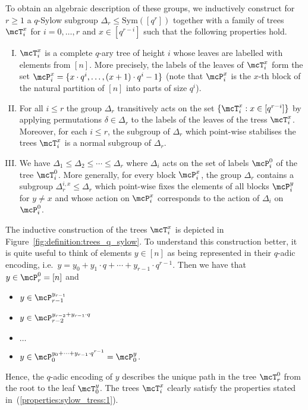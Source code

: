 \documentclass[a4paper,UKenglish]{lipics}
\newcommand{\inseg}[1]{\ensuremath{[#1]}}
\newcommand{\Sym}{\ensuremath{\text{Sym}}\xspace}
\theoremstyle{plain}
\begin{document}
To obtain an algebraic description of these groups, we inductively 
construct for $r \geq 1$ a $q$-Sylow subgroup $\Delta_r \leq \Sym(\inseg 
{q^r})$ together 
with a family of trees $\mcT_i^x$ for $i = 0, \dots, r$ 
and $x \in \inseg {q^{r-i}}$ such that the following properties
hold.
\begin{enumerate}[(I)]
 \item $\mcT_i^x$ is a complete $q$-ary tree of height $i$ whose leaves 
are labelled with elements from $\inseg n$.
 More precisely, the labels of the leaves of $\mcT_i^x$ form the set 
$\mcP_i^x = \{ x \cdot q^i, \dots, (x +1) \cdot q^i - 1 \}$ (note that 
$\mcP_i^x$ is the $x$-th block of the natural partition of $\inseg n$ into 
parts of size $q^i$).
\label{properties:sylow_tress:1}
 \item For all $i \leq r$ the group $\Delta_r$ transitively acts on the set $\{
\mcT^x_i : x \in \inseg{q^{r-i}} \}$ by applying
permutations $\delta \in \Delta_r$ to the labels of the leaves of the tress 
$\mcT_i^x$.
Moreover, for each $i \leq r$, the subgroup of $\Delta_r$ which point-wise 
stabilises the trees $\mcT_i^x$ is a normal subgroup of $\Delta_r$.
\label{properties:sylow_tress:2}
 \item We have $\Delta_1 \leq \Delta_2 \leq \cdots \leq \Delta_r$ where 
$\Delta_i$ acts on the set of labels $\mcP_i^0$ of the tree 
$\mcT_i^0$. More generally, for every block $\mcP_i^x$, the group $\Delta_r$
contains a subgroup $\Delta_r^{i,x} \leq \Delta_r$ which point-wise fixes
the elements of all blocks $\mcP_i^y$ for $y \neq x$ and whose action on
$\mcP_i^x$ corresponds to the action of $\Delta_i$ on $\mcP_i^0$.
\label{properties:sylow_tress:3}
\end{enumerate}


The inductive construction of the trees $\mcT_i^x$ is depicted in
Figure~\ref{fig:definition:trees_q_sylow}. 
To understand this construction better, it is quite
useful to think of elements $y \in \inseg n$ as being represented in their 
$q$-adic encoding, i.e.\
$y = y_0 + y_1 \cdot q + \cdots + y_{r-1} \cdot q^{r-1}$. 
Then we have that $y \in \mcP_r^0 = \inseg n$ and
\begin{itemize}
 \item $y \in \mcP_{r-1}^{y_{r-1}}$ 
 \item $y \in \mcP_{r-2}^{y_{r-2} +  y_{r-1} \cdot q}$
 \item $\dots$
 \item $y \in \mcP_{0}^{y_0 + \cdots + y_{r-1} \cdot q^{r-1}} = \mcP_0^y$.
\end{itemize}
Hence, the $q$-adic encoding of $y$ describes the unique path in the tree 
$\mcT_r^0$ from the root to the leaf $\mcT_0^y$.
The trees $\mcT_i^x$ clearly satisfy the properties stated
in~(\ref{properties:sylow_tress:1}).
\end{document}
